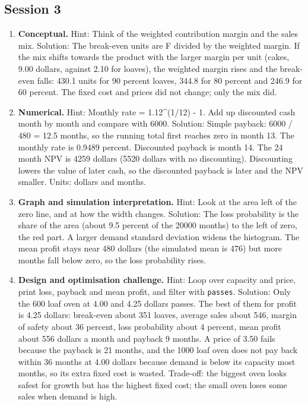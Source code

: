 \documentclass[11pt,a4paper]{article}
\begin{document}
\subsection*{Session 3}
\begin{enumerate}[nosep]
\item \textbf{Conceptual.} Hint: Think of the weighted contribution margin and the sales mix. Solution: The break-even units are F divided by the weighted margin. If the mix shifts towards the product with the larger margin per unit (cakes, 9.00 dollars, against 2.10 for loaves), the weighted margin rises and the break-even falls: 430.1 units for 90 percent loaves, 344.8 for 80 percent and 246.9 for 60 percent. The fixed cost and prices did not change; only the mix did.
\item \textbf{Numerical.} Hint: Monthly rate = 1.12\textasciicircum{}(1/12) - 1. Add up discounted cash month by month and compare with 6000. Solution: Simple payback: 6000 / 480 = 12.5 months, so the running total first reaches zero in month 13. The monthly rate is 0.9489 percent. Discounted payback is month 14. The 24 month NPV is 4259 dollars (5520 dollars with no discounting). Discounting lowers the value of later cash, so the discounted payback is later and the NPV smaller. Units: dollars and months.
\item \textbf{Graph and simulation interpretation.} Hint: Look at the area left of the zero line, and at how the width changes. Solution: The loss probability is the share of the area (about 9.5 percent of the 20000 months) to the left of zero, the red part. A larger demand standard deviation widens the histogram. The mean profit stays near 480 dollars (the simulated mean is 476) but more months fall below zero, so the loss probability rises.
\item \textbf{Design and optimisation challenge.} Hint: Loop over capacity and price, print loss, payback and mean profit, and filter with \texttt{passes}. Solution: Only the 600 loaf oven at 4.00 and 4.25 dollars passes. The best of them for profit is 4.25 dollars: break-even about 351 loaves, average sales about 546, margin of safety about 36 percent, loss probability about 4 percent, mean profit about 556 dollars a month and payback 9 months. A price of 3.50 fails because the payback is 21 months, and the 1000 loaf oven does not pay back within 36 months at 4.00 dollars because demand is below its capacity most months, so its extra fixed cost is wasted. Trade-off: the biggest oven looks safest for growth but has the highest fixed cost; the small oven loses some sales when demand is high.
\end{enumerate}
\end{document}
